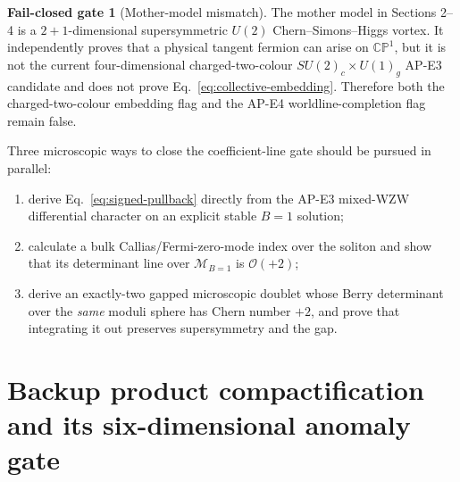 \documentclass[11pt]{article}
\theoremstyle{definition}
\newtheorem{gate}[theorem]{Fail-closed gate}
\theoremstyle{remark}
\newcommand{\CP}{\mathbb {CP}}
\newcommand{\cO}{\mathcal O}
\newcommand{\cM}{\mathcal M}
\begin{document}
\begin{gate}[Mother-model mismatch]
The mother model in Sections 2--4 is a \(2+1\)-dimensional supersymmetric
\(U(2)\) Chern--Simons--Higgs vortex.  It independently proves that a
physical tangent fermion can arise on \(\CP^1\), but it is not the current
four-dimensional charged-two-colour
\(SU(2)_c\times U(1)_g\) AP-E3 candidate and does not prove
Eq.~\eqref{eq:collective-embedding}.  Therefore both the charged-two-colour
embedding flag and the AP-E4 worldline-completion flag remain false.
\end{gate}

Three microscopic ways to close the coefficient-line gate should be pursued
in parallel:
\begin{enumerate}
\item derive Eq.~\eqref{eq:signed-pullback} directly from the AP-E3
  mixed-WZW differential character on an explicit stable \(B=1\) solution;
\item calculate a bulk Callias/Fermi-zero-mode index over the soliton and
  show that its determinant line over \(\cM_{B=1}\) is \(\cO(+2)\);
\item derive an exactly-two gapped microscopic doublet whose Berry
  determinant over the \emph{same} moduli sphere has Chern number \(+2\),
  and prove that integrating it out preserves supersymmetry and the gap.
\end{enumerate}

\section{Backup product compactification and its six-dimensional anomaly gate}
\end{document}
